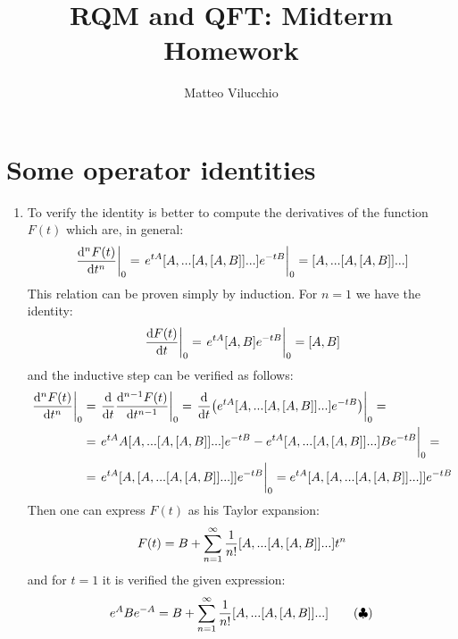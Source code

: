 \documentclass[11pt, oneside]{article}   	%
\title{RQM and QFT: Midterm Homework}
\author{Matteo Vilucchio}
\begin{document}
\maketitle

\section{Some operator identities}

\begin{enumerate}[label=\alph*)]

\item To verify the identity is better to compute the derivatives of the function $F(t)$ which are, in general:
\[
	\eval{\dv[n]{F(t)}{t}}_0 = \eval{e^{tA} [A,...\comm{A}{\comm{A}{B}}...]e^{-tB}}_0 = [A,...\comm{A}{\comm{A}{B}}...]
\]
This relation can be proven simply by induction. For $n = 1$ we have the identity:
\[
	\eval{\dv{F(t)}{t}}_0 = \eval{e^{tA} \comm{A}{B} e^{-tB}}_0 = \comm{A}{B}
\]
and the inductive step can be verified as follows:
\begin{align*}
	\eval{\dv[n]{F(t)}{t}}_0 &= \eval{ \dv{t} \dv[n-1]{F(t)}{t} }_0 = \eval{ \dv{t}\qty( e^{tA} [A,...\comm{A}{\comm{A}{B}}...]e^{-tB} ) }_0 = \\
	&= \eval{ e^{tA} A [A,...\comm{A}{\comm{A}{B}}...]e^{-tB}  - e^{tA} [A,...\comm{A}{\comm{A}{B}}...] B e^{-tB} }_0 = \\
	&= \eval{ e^{tA} [A, [A,...\comm{A}{\comm{A}{B}}...]]e^{-tB}}_0 =  e^{tA} [A, [A,...\comm{A}{\comm{A}{B}}...]]e^{-tB}
\end{align*}
Then one can express $F(t)$ as his Taylor expansion:
\[
	F(t) = B + \sum_{n=1}^\infty \frac{1}{n!} [A,...\comm{A}{\comm{A}{B}}...] t^n
\]
and for $t = 1$ it is verified the given expression:
\[
	e^A B e^{-A} = B + \sum_{n=1}^\infty \frac{1}{n!} [A,...\comm{A}{\comm{A}{B}}...]  \label{eq:comm-relation} \tag{$\clubsuit$}
\]


\end{enumerate}
\end{document}

